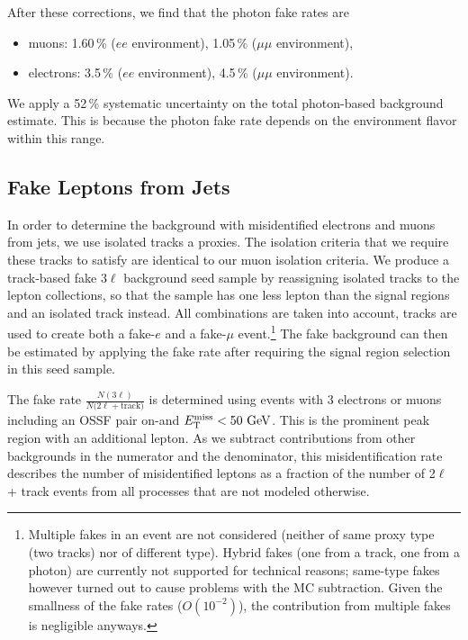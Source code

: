 After these corrections, we find that the photon fake rates are
\begin{itemize}
	\item muons: 1.60\,\% ($ee$ environment), 1.05\,\% ($\mu\mu$ environment),
	\item electrons: 3.5\,\% ($ee$ environment), 4.5\,\% ($\mu\mu$ environment).
\end{itemize}

We apply a 52\,\% systematic uncertainty on the total photon-based background estimate. This is because the photon fake rate depends on the environment flavor within this range.


\subsection{Fake Leptons from Jets}
In order to determine the background with misidentified electrons and muons from jets, we use isolated tracks a proxies. The isolation criteria that we require these tracks to satisfy are identical to our muon isolation criteria. We produce a track-based fake 3$\ell$ background seed sample by reassigning isolated tracks to the lepton collections, so that the sample has one less lepton than the signal regions and an isolated track instead. All combinations are taken into account, \ie tracks are used to create both a fake-$e$ and a fake-$\mu$ event.\footnote{Multiple fakes in an event are not considered (neither of same proxy type (\eg two tracks) nor of different type). Hybrid fakes (one from a track, one from a photon) are currently not supported for technical reasons; same-type fakes however turned out to cause problems with the \ttbar MC subtraction. Given the smallness of the fake rates ($O(10^{-2})$), the contribution from multiple fakes is negligible anyways.} The fake background can then be estimated by applying the fake rate after requiring the signal region selection in this seed sample.

The fake rate $\frac{N(3\ell)}{N(2\ell + \textrm{track)}}$ is determined using events with 3 electrons or muons including an OSSF pair on-\Z and $E_{\mathrm{T}}^{\text{miss}} < 50\,\,\text{Ge\hspace{-.08em}V}$. This is the prominent \Z peak region with an additional lepton. As we subtract contributions from other backgrounds in the numerator and the denominator, this misidentification rate describes the number of misidentified leptons as a fraction of the number of 2$\ell$ + track events from all processes that are not modeled otherwise.

